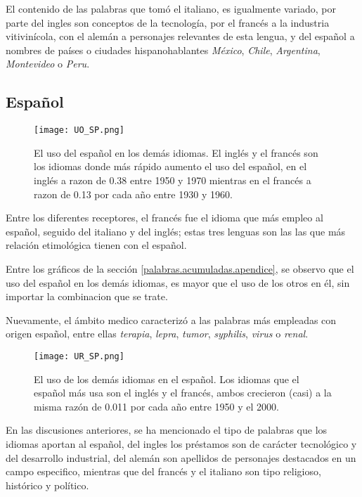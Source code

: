 El contenido de las palabras que tomó el italiano, es igualmente variado, por parte del ingles son conceptos de la tecnología, por el francés a la industria vitivinícola, con el alemán a personajes relevantes de esta lengua, y del español a nombres de países o ciudades hispanohablantes \textit{México}, \textit{Chile}, \textit{Argentina}, \textit{Montevideo} o \textit{Peru}. 



\subsection{Español} %

\begin{figure}[h!] %
	\centering
	\texttt{[image: UO\_SP.png]}
	\caption{El uso del español en los demás idiomas. El inglés y el francés son los idiomas  donde más rápido aumento el uso del español,
	en el inglés a razon de 0.38 entre 1950 y 1970 mientras  en el francés a razon de 0.13 por cada año entre 1930 y 1960.}
	\label{fig.UO_SP}
	
\end{figure}

Entre los diferentes receptores, el francés fue el idioma que más empleo al español, seguido del italiano y del inglés; estas tres lenguas son las las que más relación etimológica tienen con el español.  

Entre los gráficos de la sección \ref{palabras.acumuladas.apendice}, se observo que el uso del español en los demás idiomas, es mayor que el uso de los otros en él, sin importar la combinacion que se trate.

Nuevamente,  el ámbito medico caracterizó a las palabras más empleadas con origen español, entre ellas \textit{terapia}, \textit{lepra}, \textit{tumor}, \textit{syphilis}, \textit{virus} o \textit{renal}. 

		
\begin{figure}[h!] %
	\centering
	\texttt{[image: UR\_SP.png]}
	\caption{El uso de los demás idiomas en el español. Los idiomas que el español más usa son el inglés y el francés, ambos crecieron (casi) a la misma razón de 0.011 por cada año entre 1950 y el 2000.}
	\label{fig.UR_SP}
\end{figure}


En las discusiones anteriores, se ha mencionado el tipo de palabras que los idiomas aportan al español, del ingles los préstamos son de carácter tecnológico y del desarrollo industrial, del alemán son apellidos de personajes destacados en un campo especifico, mientras que del francés y el italiano son tipo religioso, histórico y político. 






